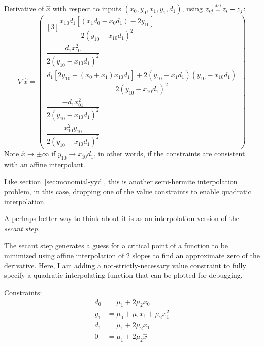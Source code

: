 Derivative of $\hat{x}$ with respect to inputs
$(x_0,y_0,x_1,y_1,d_1)$,
using $z_{ij} \operatorname*{\overset{\underset{\mathrm{def}}{}}{=}} z_i - z_j$:
\begin{equation}
\nabla \hat{x} =
\begin{pmatrix}[3]
\dfrac{
x_{10} d_1 \left[ \left(x_1 d_0 - x_0 d_1 \right) -2 y_{10}\right]
}{
2 \left(y_{10} - x_{10} d_1\right)^{2}
}
\\
\dfrac{
d_1 x_{10}^{2}
}{
2 \left(y_{10} - x_{10} d_1\right)^{2}
} 
\\
\dfrac{
d_1 \left[ 2 y_{10} - \left( x_0 + x_1 \right) x_{10} d_1 \right]
+
2 
\left(y_{10} - x_1 d_1 \right) \left( y_{10} - x_{10} d_1 \right)
}{
2 \left(y_{10} - x_{10} d_1\right)^{2}
}
\\
\dfrac{
-d_1 x_{01}^{2}
}{
2 \left(y_{10} - x_{10} d_1\right)^{2}
}
\\ 
\dfrac{x_{10}^{2} y_{10}}{
2 \left(y_{10} - x_{10} d_1\right)^{2}
}
\end{pmatrix}
\end{equation}
Note $\hat{x} \to \pm \infty$ if $y_{10} \to x_{10} d_1$,
in other words, if the constraints are consistent with an
affine interpolant.

\label{sec:monomial-dyd}

Like section~\ref{sec:monomial-yyd},
this is another semi-hermite interpolation problem,
in this case, dropping one of the value constraints to enable 
quadratic interpolation.

A perhaps better way to think about it is as an interpolation
version of the \textit{secant step.}

The secant step generates a guess for a critical point
of a function to be minimized using affine interpolation
of $2$ slopes to find an approximate zero of the derivative.
Here, I am adding a not-strictly-necessary value constraint 
to fully specify a quadratic interpolating function that can be 
plotted for debugging.

Constraints:
\begin{align}
d_0 & = \mu_1 + 2 \mu_2 x_0
\\
y_1 & = \mu_0 + \mu_1 x_1 + \mu_2 x_1^2
\nonumber
\\
d_1 & = \mu_1 + 2 \mu_2 x_1
\nonumber
\\
0 & = \mu_1 + 2 \mu_2 \hat{x}
\nonumber
\end{align}

